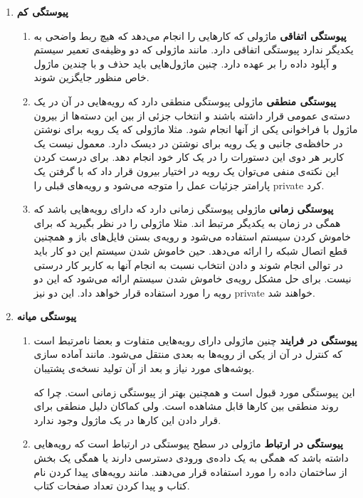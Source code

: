 \begin{enumerate}
\item \textbf{پیوستگی کم} \newline
\begin{enumerate}
\item \textbf{پیوستگی اتفاقی} \newline
ماژولی که کار‌هایی را انجام می‌دهد که هیچ ربط واضحی به یکدیگر ندارد پیوستگی اتفاقی دارد. مانند ماژولی که دو وظیفه‌ی تعمیر سیستم و آپلود داده را بر عهده دارد.
چنین ماژول‌هایی باید حذف و با چندین ماژول خاص منظور جایگزین شوند.
\item \textbf{پیوستگی منطقی} \newline
ماژولی پیوستگی منطقی دارد که رویه‌هایی در آن در یک دسته‌ی عمومی قرار داشته باشند و انتخاب جزئی از بین این دسته‌ها از بیرون ماژول با فراخوانی یکی از آنها انجام شود. مثلا ماژولی که یک رویه برای نوشتن در حافظه‌ی جانبی و یک رویه برای نوشتن در دیسک دارد. معمول نیست یک کاربر هر دوی این دستورات را در یک کار خود انجام دهد. 
برای درست کردن این نکته‌ی منفی می‌توان یک رویه در اختیار بیرون قرار داد که با گرفتن یک پارامتر جزئیات عمل را متوجه می‌شود و رویه‌های قبلی را private کرد.
\item \textbf{پیوستگی زمانی} \newline
ماژولی پیوستگی زمانی دارد که دارای رویه‌هایی باشد که همگی در زمان به یکدیگر مرتبط اند. مثلا ماژولی را در نظر بگیرید که برای خاموش کردن سیستم استفاده می‌شود و رویه‌ی بستن فایل‌های باز و همچنین قطع اتصال شبکه را ارائه می‌دهد. حین خاموش شدن سیستم این دو کار باید در توالی انجام شوند و دادن انتخاب نسبت به انجام آنها به کاربر کار درستی نیست.
برای حل مشکل رویه‌ی خاموش شدن سیستم ارائه می‌شود که این دو رویه را مورد استفاده قرار خواهد داد. این دو نیز private خواهند شد.
\end{enumerate}
\item \textbf{پیوستگی میانه} \newline
\begin{enumerate}
\item \textbf{پیوستگی در فرایند} \newline
چنین ماژولی دارای رویه‌هایی متفاوت و بعضا نامرتبط است که کنترل در آن از یکی از رویه‌ها به بعدی منتقل می‌شود. مانند آماده سازی پوشه‌های مورد نیاز و بعد از آن تولید نسخه‌ی پشتیبان.

این پیوستگی مورد قبول است و همچنین بهتر از پیوستگی زمانی است. چرا که روند منطقی بین کار‌ها قابل مشاهده است. ولی کماکان دلیل منطقی برای قرار دادن این کار‌ها در یک ماژول وجود ندارد.
\item \textbf{پیوستگی در ارتباط} \newline
ماژولی در سطح پیوستگی در ارتباط است که رویه‌هایی داشته باشد که همگی به یک داده‌ی ورودی دسترسی دارند یا همگی یک بخش از ساختمان داده را مورد استفاده قرار می‌دهند. مانند رویه‌های پیدا کردن نام کتاب و پیدا کردن تعداد صفحات کتاب.


\end{enumerate}
\end{enumerate}
